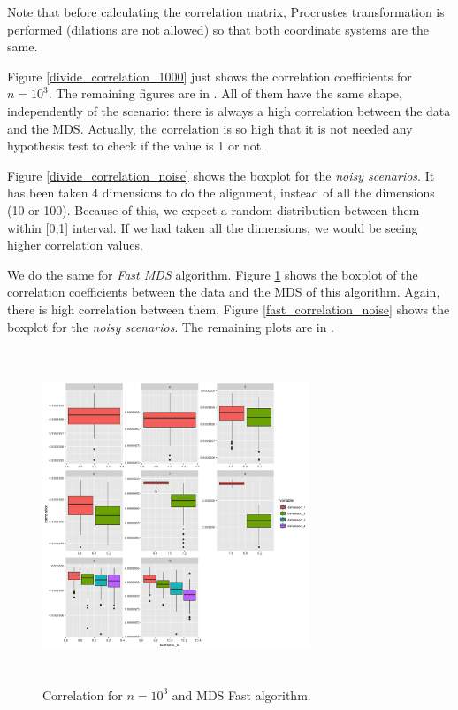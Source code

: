 \documentclass[11pt]{report}
\begin{document}
\indent Note that before calculating the correlation matrix, Procrustes 
transformation is performed (dilations are not allowed) so that both coordinate 
systems are the same.

\indent Figure \ref{divide_correlation_1000} just shows the correlation
coefficients for $n = 10^3$. The remaining figures are in 
. All of them have the same shape, independently of the
scenario: there is always a high correlation between the data and the MDS. 
Actually, the correlation is so high that it is not needed any hypothesis test
to check if the value is 1 or not. 

\indent Figure \ref{divide_correlation_noise} shows the boxplot for the 
\textit{noisy scenarios}. It has been taken 4 dimensions to do the alignment, 
instead of all the dimensions (10 or 100). Because of this, we expect a random 
distribution between them within [0,1] interval. If we had taken all the 
dimensions, we would be seeing higher correlation values. 

\indent We do the same for \textit{Fast MDS} algorithm. Figure 
\ref{fast_correlation_1000} shows the boxplot of the correlation coefficients 
between the data and the MDS of this algorithm. Again, there is high correlation 
between them. Figure \ref{fast_correlation_noise} shows the boxplot for the 
\textit{noisy scenarios}. The remaining plots are in .


\begin{figure}[!ht]
\centering
    \includegraphics[width=8cm, height=10cm]{./images/fast_correlation_1000.png}
    \caption{Correlation for $n = 10^3$ and MDS Fast algorithm.}
    \label{fast_correlation_1000}
\end{figure}
\end{document}
